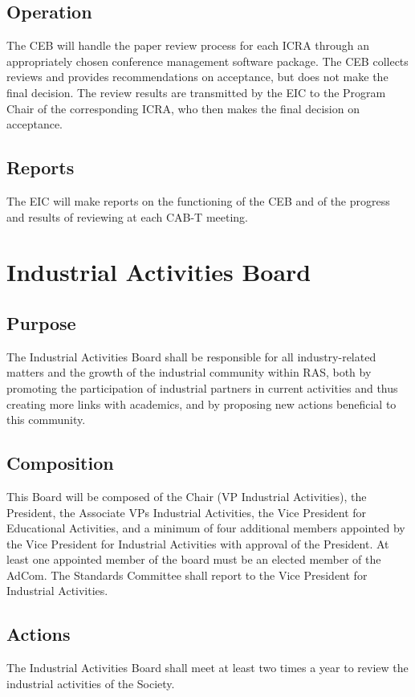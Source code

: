 \documentclass[10pt]{article}
\begin{document}
\subsection{Operation}

The CEB will handle the paper review process for each ICRA through an appropriately chosen conference management software package. The CEB collects reviews and provides recommendations on acceptance, but does not make the final decision. The review results are transmitted by the EIC to the Program Chair of the corresponding ICRA, who then makes the final decision on acceptance. 

\subsection{Reports}

The EIC will make reports on the functioning of the CEB and of the progress and results of reviewing at each CAB-T meeting.


\section{Industrial Activities Board}
\label{IAB}
\subsection{Purpose}

The Industrial Activities Board shall be responsible for all industry-related matters and the growth of the industrial community within RAS, both by promoting the participation of industrial partners in current activities and thus creating more links with academics, and by proposing new actions beneficial to this community.

\subsection{Composition}
This Board will be composed of the Chair (VP Industrial Activities), the President, the Associate VPs Industrial Activities, the Vice President for Educational Activities, and a minimum of four additional members appointed by the Vice President for Industrial Activities with approval of the President. At least one appointed member of the board must be an elected member of the AdCom. The Standards Committee shall report to the Vice President for Industrial Activities.

\subsection{Actions}
The Industrial Activities Board shall meet at least two times a year to review the industrial activities of the Society.
\end{document}
